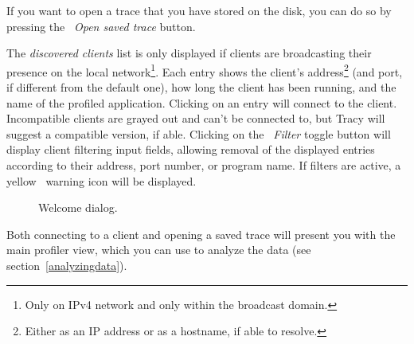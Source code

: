 \documentclass[hidelinks,titlepage,a4paper]{article}
\begin{document}
If you want to open a trace that you have stored on the disk, you can do so by pressing the \faFolderOpen{}~\emph{Open saved trace} button.

The \emph{discovered clients} list is only displayed if clients are broadcasting their presence on the local network\footnote{Only on IPv4 network and only within the broadcast domain.}. Each entry shows the client's address\footnote{Either as an IP address or as a hostname, if able to resolve.} (and port, if different from the default one), how long the client has been running, and the name of the profiled application. Clicking on an entry will connect to the client. Incompatible clients are grayed out and can't be connected to, but Tracy will suggest a compatible version, if able. Clicking on the \emph{\faFilter{}~Filter} toggle button will display client filtering input fields, allowing removal of the displayed entries according to their address, port number, or program name. If filters are active, a yellow \faExclamationTriangle{}~warning icon will be displayed.

\begin{figure}[h]
\centering{}
\caption{Welcome dialog.}
\label{welcomedialog}
\end{figure}

Both connecting to a client and opening a saved trace will present you with the main profiler view, which you can use to analyze the data (see section~\ref{analyzingdata}).
\end{document}
